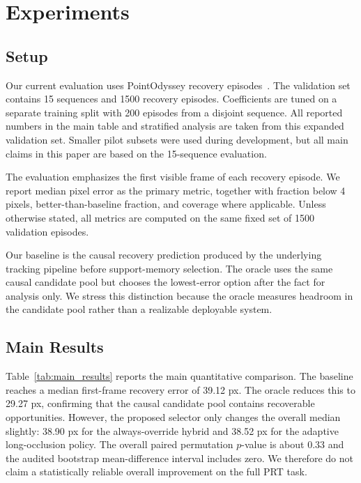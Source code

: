 \documentclass[10pt,journal,compsoc]{IEEEtran}
\begin{document}
\section{Experiments}
\label{sec:experiments}

\subsection{Setup}

Our current evaluation uses PointOdyssey recovery episodes~\cite{pointodyssey2023}. The validation set contains 15 sequences and 1500 recovery episodes. Coefficients are tuned on a separate training split with 200 episodes from a disjoint sequence. All reported numbers in the main table and stratified analysis are taken from this expanded validation set. Smaller pilot subsets were used during development, but all main claims in this paper are based on the 15-sequence evaluation.

The evaluation emphasizes the first visible frame of each recovery episode. We report median pixel error as the primary metric, together with fraction below 4 pixels, better-than-baseline fraction, and coverage where applicable. Unless otherwise stated, all metrics are computed on the same fixed set of 1500 validation episodes.

Our baseline is the causal recovery prediction produced by the underlying tracking pipeline before support-memory selection. The oracle uses the same causal candidate pool but chooses the lowest-error option after the fact for analysis only. We stress this distinction because the oracle measures headroom in the candidate pool rather than a realizable deployable system.

\subsection{Main Results}

Table~\ref{tab:main_results} reports the main quantitative comparison. The baseline reaches a median first-frame recovery error of 39.12 px. The oracle reduces this to 29.27 px, confirming that the causal candidate pool contains recoverable opportunities. However, the proposed selector only changes the overall median slightly: 38.90 px for the always-override hybrid and 38.52 px for the adaptive long-occlusion policy. The overall paired permutation $p$-value is about 0.33 and the audited bootstrap mean-difference interval includes zero. We therefore do not claim a statistically reliable overall improvement on the full PRT task.
\end{document}

